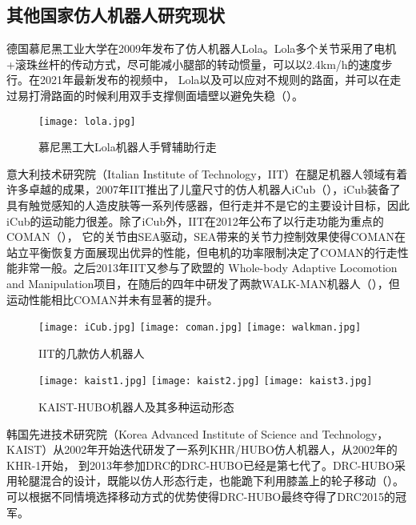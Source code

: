 \subsection{其他国家仿人机器人研究现状}
德国慕尼黑工业大学在2009年发布了仿人机器人Lola\cite{buschmann2009humanoid}。Lola多个关节采用了电机+滚珠丝杆的传动方式，尽可能减小腿部的转动惯量，可以以2.4km/h的速度步行。在2021年最新发布的视频中，
Lola以及可以应对不规则的路面，并可以在走过易打滑路面的时候利用双手支撑侧面墙壁以避免失稳\cite{Lola}（）。
\begin{figure}[htbp]
    \centering
    \texttt{[image: lola.jpg]}
    \caption{\label{fig:lola}慕尼黑工大Lola机器人手臂辅助行走}
\end{figure}

意大利技术研究院（Italian Institute of Technology，IIT）在腿足机器人领域有着许多卓越的成果，2007年IIT推出了儿童尺寸的仿人机器人iCub\cite{tsagarakis2007icub}（），iCub装备了
具有触觉感知的人造皮肤等一系列传感器，但行走并不是它的主要设计目标，因此iCub的运动能力很差。除了iCub外，IIT在2012年公布了以行走功能为重点的COMAN\cite{dallali2012global}（），
它的关节由SEA驱动，SEA带来的关节力控制效果使得COMAN在站立平衡恢复方面展现出优异的性能，但电机的功率限制决定了COMAN的行走性能非常一般。之后2013年IIT又参与了欧盟的
Whole-body Adaptive Locomotion and Manipulation项目，在随后的四年中研发了两款WALK-MAN机器人\cite{tsagarakis2017walk}（），但运动性能相比COMAN并未有显著的提升。

\begin{figure}[htbp]
    \centering
        {%
            \texttt{[image: iCub.jpg]}}
        {%
            \texttt{[image: coman.jpg]}}
        {%
            \texttt{[image: walkman.jpg]}}            
    \caption{IIT的几款仿人机器人\label{fig:iit_biped}}
\end{figure}
\begin{figure}[htbp]
    \centering
    \texttt{[image: kaist1.jpg]}
    \texttt{[image: kaist2.jpg]}
    \texttt{[image: kaist3.jpg]}
    \caption{\label{fig:kaist_hubo}KAIST-HUBO机器人及其多种运动形态}
\end{figure}

韩国先进技术研究院（Korea Advanced Institute of Science and Technology，KAIST）从2002年开始迭代研发了一系列KHR/HUBO仿人机器人，从2002年的KHR-1开始，
到2013年参加DRC的DRC-HUBO已经是第七代了。DRC-HUBO采用轮腿混合的设计，既能以仿人形态行走，也能跪下利用膝盖上的轮子移动\cite{zucker2015general}（）。
可以根据不同情境选择移动方式的优势使得DRC-HUBO最终夺得了DRC2015的冠军。
